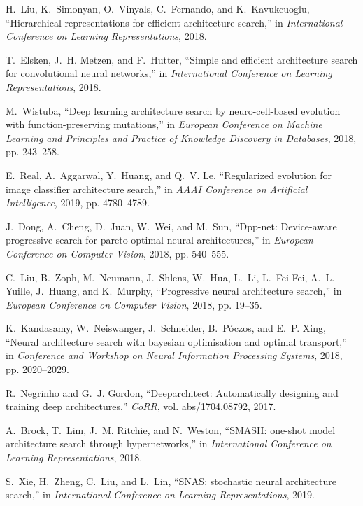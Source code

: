 \documentclass[journal]{IEEEtran}
\begin{document}
\begin{thebibliography}{10}
H.~Liu, K.~Simonyan, O.~Vinyals, C.~Fernando, and K.~Kavukcuoglu,
  ``Hierarchical representations for efficient architecture search,'' in
  \emph{International Conference on Learning Representations}, 2018.

T.~Elsken, J.~H. Metzen, and F.~Hutter, ``Simple and efficient architecture
  search for convolutional neural networks,'' in \emph{International Conference
  on Learning Representations}, 2018.

M.~Wistuba, ``Deep learning architecture search by neuro-cell-based evolution
  with function-preserving mutations,'' in \emph{European Conference on Machine
  Learning and Principles and Practice of Knowledge Discovery in Databases},
  2018, pp. 243--258.

E.~Real, A.~Aggarwal, Y.~Huang, and Q.~V. Le, ``Regularized evolution for image
  classifier architecture search,'' in \emph{AAAI Conference on Artificial
  Intelligence}, 2019, pp. 4780--4789.

J.~Dong, A.~Cheng, D.~Juan, W.~Wei, and M.~Sun, ``Dpp-net: Device-aware
  progressive search for pareto-optimal neural architectures,'' in
  \emph{European Conference on Computer Vision}, 2018, pp. 540--555.

C.~Liu, B.~Zoph, M.~Neumann, J.~Shlens, W.~Hua, L.~Li, L.~Fei{-}Fei, A.~L.
  Yuille, J.~Huang, and K.~Murphy, ``Progressive neural architecture search,''
  in \emph{European Conference on Computer Vision}, 2018, pp. 19--35.

K.~Kandasamy, W.~Neiswanger, J.~Schneider, B.~P{\'{o}}czos, and E.~P. Xing,
  ``Neural architecture search with bayesian optimisation and optimal
  transport,'' in \emph{Conference and Workshop on Neural Information
  Processing Systems}, 2018, pp. 2020--2029.

R.~Negrinho and G.~J. Gordon, ``Deeparchitect: Automatically designing and
  training deep architectures,'' \emph{CoRR}, vol. abs/1704.08792, 2017.

A.~Brock, T.~Lim, J.~M. Ritchie, and N.~Weston, ``{SMASH:} one-shot model
  architecture search through hypernetworks,'' in \emph{International
  Conference on Learning Representations}, 2018.

S.~Xie, H.~Zheng, C.~Liu, and L.~Lin, ``{SNAS:} stochastic neural architecture
  search,'' in \emph{International Conference on Learning Representations},
  2019.


\end{thebibliography}
\end{document}
